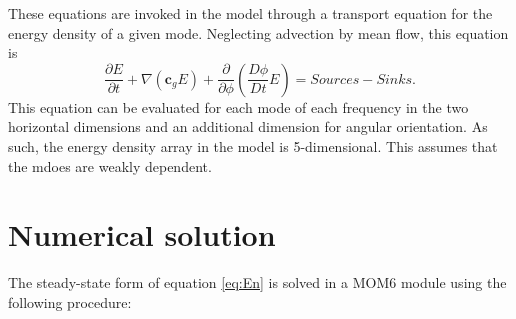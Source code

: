 \documentclass[12pt]{article}
\begin{document}
These equations are invoked in the model through a transport equation for the energy density of a given mode. Neglecting advection by mean flow, this equation is
\begin{equation}
	\label{eq:En}
	\frac{\partial E}{\partial t} + \nabla (\textbf{c}_gE) + \frac{\partial}{\partial\phi}\left(\frac{D\phi}{Dt}E\right) = Sources - Sinks.
\end{equation}
This equation can be evaluated for each mode of each frequency in the two horizontal dimensions and an additional dimension for angular orientation. As such, the energy density array in the model is 5-dimensional. This assumes that the mdoes are weakly dependent. 

\section{Numerical solution}
The steady-state form of equation \ref{eq:En} is solved in a MOM6 module using the following procedure:
\end{document}
